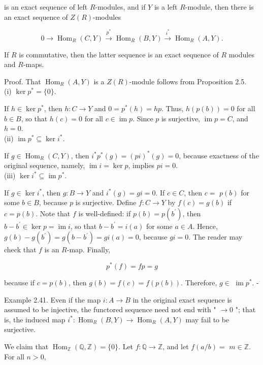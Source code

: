 \documentclass[10pt]{article}
\begin{document}
is an exact sequence of left $R$-modules, and if $Y$ is a left $R$-module, then there is an exact sequence of $Z(R)$-modules

$$
0 \rightarrow \operatorname{Hom}_{R}(C, Y) \xrightarrow{p^{*}} \operatorname{Hom}_{R}(B, Y) \xrightarrow{i^{*}} \operatorname{Hom}_{R}(A, Y) .
$$

If $R$ is commutative, then the latter sequence is an exact sequence of $R$ modules and $R$-maps.

Proof. That $\operatorname{Hom}_{R}(A, Y)$ is a $Z(R)$-module follows from Proposition 2.5.\\
(i) $\operatorname{ker} p^{*}=\{0\}$.

If $h \in \operatorname{ker} p^{*}$, then $h: C \rightarrow Y$ and $0=p^{*}(h)=h p$. Thus, $h(p(b))=0$ for all $b \in B$, so that $h(c)=0$ for all $c \in \operatorname{im} p$. Since $p$ is surjective, $\operatorname{im} p=C$, and $h=0$.\\
(ii) $\operatorname{im} p^{*} \subseteq \operatorname{ker} i^{*}$.

If $g \in \operatorname{Hom}_{R}(C, Y)$, then $i^{*} p^{*}(g)=(p i)^{*}(g)=0$, because exactness of the original sequence, namely, $\operatorname{im} i=\operatorname{ker} p$, implies $p i=0$.\\
(iii) $\operatorname{ker} i^{*} \subseteq \operatorname{im} p^{*}$.

If $g \in \operatorname{ker} i^{*}$, then $g: B \rightarrow Y$ and $i^{*}(g)=g i=0$. If $c \in C$, then $c=$ $p(b)$ for some $b \in B$, because $p$ is surjective. Define $f: C \rightarrow Y$ by $f(c)=g(b)$ if $c=p(b)$. Note that $f$ is well-defined: if $p(b)=p\left(b^{\prime}\right)$, then $b-b^{\prime} \in \operatorname{ker} p=\operatorname{im} i$, so that $b-b^{\prime}=i(a)$ for some $a \in A$. Hence, $g(b)-g\left(b^{\prime}\right)=g\left(b-b^{\prime}\right)=g i(a)=0$, because $g i=0$. The reader may check that $f$ is an $R$-map. Finally,

$$
p^{*}(f)=f p=g
$$

because if $c=p(b)$, then $g(b)=f(c)=f(p(b))$. Therefore, $g \in$ $\operatorname{im} p^{*}$. -

Example 2.41. Even if the map $i: A \rightarrow B$ in the original exact sequence is assumed to be injective, the functored sequence need not end with " $\rightarrow 0$ "; that is, the induced map $i^{*}: \operatorname{Hom}_{R}(B, Y) \rightarrow \operatorname{Hom}_{R}(A, Y)$ may fail to be surjective.

We claim that $\operatorname{Hom}_{\mathbb{Z}}(\mathbb{Q}, \mathbb{Z})=\{0\}$. Let $f: \mathbb{Q} \rightarrow \mathbb{Z}$, and let $f(a / b)=$ $m \in \mathbb{Z}$. For all $n>0$,
\end{document}
